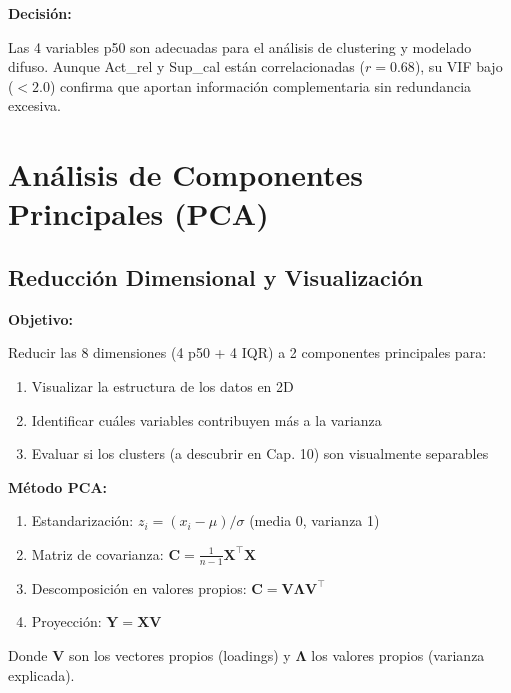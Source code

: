 \documentclass[12pt,letterpaper,twoside]{report}
\newcommand{\mat}[1]{\mathbf{#1}}
\begin{document}
\begin{decisionbox}
\textbf{Decisión:}

Las 4 variables p50 son adecuadas para el análisis de clustering y modelado difuso. Aunque Act\_rel y Sup\_cal están correlacionadas ($r=0.68$), su VIF bajo ($<2.0$) confirma que aportan información complementaria sin redundancia excesiva.
\end{decisionbox}

\section{Análisis de Componentes Principales (PCA)}

\subsection{Reducción Dimensional y Visualización}

\begin{hipotesisbox}
\textbf{Objetivo:}

Reducir las 8 dimensiones (4 p50 + 4 IQR) a 2 componentes principales para:
\begin{enumerate}[noitemsep]
    \item Visualizar la estructura de los datos en 2D
    \item Identificar cuáles variables contribuyen más a la varianza
    \item Evaluar si los clusters (a descubrir en Cap. 10) son visualmente separables
\end{enumerate}
\end{hipotesisbox}

\begin{estadisticobox}
\textbf{Método PCA:}

\begin{enumerate}[noitemsep]
    \item Estandarización: $z_i = (x_i - \mu) / \sigma$ (media 0, varianza 1)
    \item Matriz de covarianza: $\mat{C} = \frac{1}{n-1}\mat{X}^\top\mat{X}$
    \item Descomposición en valores propios: $\mat{C} = \mat{V}\mat{\Lambda}\mat{V}^\top$
    \item Proyección: $\mat{Y} = \mat{X}\mat{V}$
\end{enumerate}

Donde $\mat{V}$ son los vectores propios (loadings) y $\mat{\Lambda}$ los valores propios (varianza explicada).
\end{estadisticobox}
\end{document}
